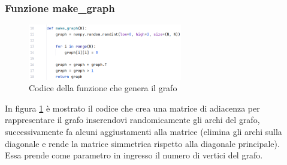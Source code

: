 \documentclass[12pt]{article}
\begin{document}
\subsubsection{Funzione make\_graph}
\begin{figure}[h]
    \centering
    \includegraphics[width=0.6\textwidth]{images/main_code_images/make_graph.png}
    \caption{Codice della funzione che genera il grafo}
    \label{fig:make_graph}
\end{figure}
In figura \ref{fig:make_graph} è mostrato il codice che crea una matrice di adiacenza per rappresentare il grafo inserendovi randomicamente gli archi del grafo, successivamente fa alcuni aggiustamenti alla matrice (elimina gli archi sulla diagonale e rende la matrice simmetrica rispetto alla diagonale principale).\\
Essa prende come parametro in ingresso il numero di vertici del grafo.
\end{document}
